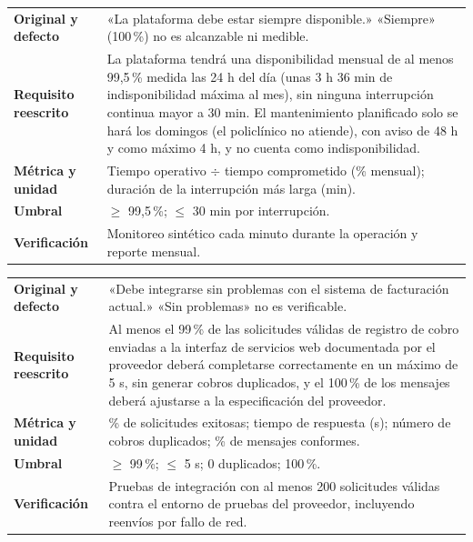 \documentclass[11pt,a4paper]{article}
\begin{document}
\begin{tabularx}{\textwidth}{@{}>{\bfseries}p{3.15cm}Y@{}}
\toprule
Original y defecto & «La plataforma debe estar siempre disponible.» «Siempre» (100\,\%) no es alcanzable ni medible.\\
Requisito reescrito & La plataforma tendrá una disponibilidad mensual de al menos 99,5\,\% medida las 24 h del día (unas 3 h 36 min de indisponibilidad máxima al mes), sin ninguna interrupción continua mayor a 30 min. El mantenimiento planificado solo se hará los domingos (el policlínico no atiende), con aviso de 48 h y como máximo 4 h, y no cuenta como indisponibilidad.\\
Métrica y unidad & Tiempo operativo $\div$ tiempo comprometido (\% mensual); duración de la interrupción más larga (min).\\
Umbral & $\geq$ 99,5\,\%; $\leq$ 30 min por interrupción.\\
Verificación & Monitoreo sintético cada minuto durante la operación y reporte mensual.\\
\bottomrule
\end{tabularx}

\begin{tabularx}{\textwidth}{@{}>{\bfseries}p{3.15cm}Y@{}}
\toprule
Original y defecto & «Debe integrarse sin problemas con el sistema de facturación actual.» «Sin problemas» no es verificable.\\
Requisito reescrito & Al menos el 99\,\% de las solicitudes válidas de registro de cobro enviadas a la interfaz de servicios web documentada por el proveedor deberá completarse correctamente en un máximo de 5 s, sin generar cobros duplicados, y el 100\,\% de los mensajes deberá ajustarse a la especificación del proveedor.\\
Métrica y unidad & \% de solicitudes exitosas; tiempo de respuesta (s); número de cobros duplicados; \% de mensajes conformes.\\
Umbral & $\geq$ 99\,\%; $\leq$ 5 s; 0 duplicados; 100\,\%.\\
Verificación & Pruebas de integración con al menos 200 solicitudes válidas contra el entorno de pruebas del proveedor, incluyendo reenvíos por fallo de red.\\
\bottomrule
\end{tabularx}
\endgroup

\end{document}
